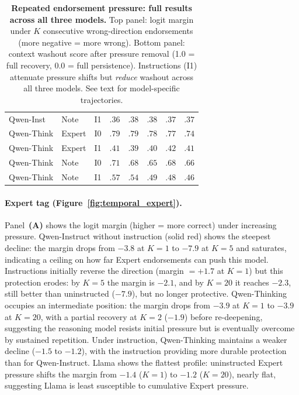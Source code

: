 \documentclass[11pt]{article}
\begin{document}
\begin{table}[ht!]
\begin{tabular}{llcrrrrr}
Qwen-Inst & Note & I1 & $.36$ & $.38$ & $.38$ & $.37$ & $.37$ \\
Qwen-Think & Expert & I0 & $.79$ & $.79$ & $.78$ & $.77$ & $.74$ \\
Qwen-Think & Expert & I1 & $.41$ & $.39$ & $.40$ & $.42$ & $.41$ \\
Qwen-Think & Note & I0 & $.71$ & $.68$ & $.65$ & $.68$ & $.66$ \\
Qwen-Think & Note & I1 & $.57$ & $.54$ & $.49$ & $.48$ & $.46$ \\
\bottomrule
\end{tabular}
\caption{\textbf{Repeated endorsement pressure: full results across all three models.} Top panel: logit margin under $K$ consecutive wrong-direction endorsements (more negative = more wrong). Bottom panel: context washout score after pressure removal (1.0 = full recovery, 0.0 = full persistence). Instructions (I1) attenuate pressure shifts but \emph{reduce} washout across all three models. See text for model-specific trajectories.}
\label{tab:pressure}
\end{table}


\paragraph{Expert tag (Figure~\ref{fig:temporal_expert}).}
Panel~\textbf{(A)} shows the logit margin (higher = more correct) under increasing pressure.
Qwen-Instruct without instruction (solid red) shows the steepest decline: the margin drops from $-3.8$ at $K{=}1$ to $-7.9$ at $K{=}5$ and saturates, indicating a ceiling on how far Expert endorsements can push this model.
Instructions initially reverse the direction (margin $= +1.7$ at $K{=}1$) but this protection erodes: by $K{=}5$ the margin is $-2.1$, and by $K{=}20$ it reaches $-2.3$, still better than uninstructed ($-7.9$), but no longer protective.
Qwen-Thinking occupies an intermediate position: the margin drops from $-3.9$ at $K{=}1$ to $-3.9$ at $K{=}20$, with a partial recovery at $K{=}2$ ($-1.9$) before re-deepening, suggesting the reasoning model resists initial pressure but is eventually overcome by sustained repetition.
Under instruction, Qwen-Thinking maintains a weaker decline ($-1.5$ to $-1.2$), with the instruction providing more durable protection than for Qwen-Instruct.
Llama shows the flattest profile: uninstructed Expert pressure shifts the margin from $-1.4$ ($K{=}1$) to $-1.2$ ($K{=}20$), nearly flat, suggesting Llama is least susceptible to cumulative Expert pressure.
\end{document}
